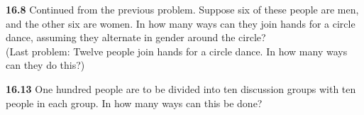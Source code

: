 \documentclass[10pt]{article}
\begin{document}
\begin{framed}
	\textbf{16.8} Continued from the previous problem. Suppose six of these people are men, and the
    other six are women. In how many ways can they join hands for a circle dance, assuming
    they alternate in gender around the circle?\\

    (Last problem: Twelve people join hands for a circle dance. In how many ways can they do this?)
\end{framed}

\pagebreak

\begin{framed}
    \textbf{16.13} One hundred people are to be divided into ten discussion groups with ten people in each group.
    In how many ways can this be done?
\end{framed}
\end{document}
